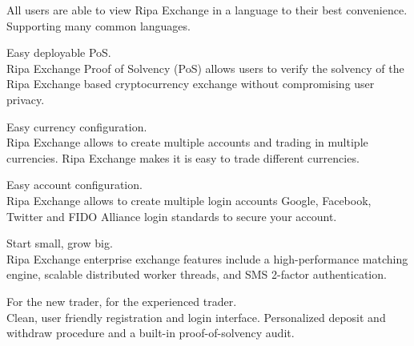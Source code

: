 \documentclass[11pt,fleqn,oneside]{book} %
\begin{document}
\begin{tcolorbox}[featureBox,
	title=\textsc{Internationalization} \faLanguage]

	\small	All users are able to view Ripa Exchange in a language to their best convenience.\\\vspace{5mm}
	\tiny Supporting many common languages.
\end{tcolorbox}
\begin{tcolorbox}[featureBox,
	title=\textsc{Proof of Solvency} \faUsers]

	\small	Easy deployable PoS.\\\vspace{5mm}
	\tiny Ripa Exchange Proof of Solvency (PoS) allows users to verify 
	the solvency of the Ripa Exchange based cryptocurrency exchange without compromising user privacy.
\end{tcolorbox}
\begin{tcolorbox}[featureBox,
	title=\textsc{Multi-Accounts Trading} \faHandSpockO]

	\small	Easy currency configuration.\\\vspace{5mm}
	\tiny Ripa Exchange allows to create multiple accounts and trading in multiple currencies. 
	Ripa Exchange makes it is easy to trade different currencies.
\end{tcolorbox}

\begin{tcolorbox}[featureBox,
	title=\textsc{Multi-Accounts Users} \faSuitcase]

	\small	Easy account configuration.\\\vspace{5mm}
	\tiny Ripa Exchange allows to create multiple login accounts Google, Facebook, Twitter and FIDO Alliance
	login standards to secure your account.
\end{tcolorbox}
\begin{tcolorbox}[featureBox,
	title=\textsc{Enterprise Exchange} \faInstitution]

	\small	Start small, grow big.\\\vspace{5mm}
	\tiny Ripa Exchange enterprise exchange features include a high-performance matching engine, 
	scalable distributed worker threads, and SMS 2-factor authentication.
\end{tcolorbox}
\begin{tcolorbox}[featureBox,
	title=\textsc{Functional \& Intuitive} \faIntersex]

	\small	For the new trader, for the experienced trader.\\\vspace{5mm}
	\tiny Clean, user friendly registration and login interface. 
	Personalized deposit and withdraw procedure and a built-in proof-of-solvency audit.
\end{tcolorbox}
\end{document}
